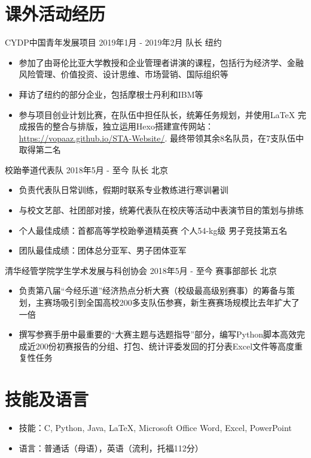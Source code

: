 \documentclass{resumeZH}
\begin{document}
    \section{课外活动经历}
    \Experience
    {CYDP中国青年发展项目}
    {2019年1月 - 2019年2月}
    {队长}
    {纽约}
    \begin{itemize}
        \item 参加了由哥伦比亚大学教授和企业管理者讲演的课程，包括行为经济学、金融风险管理、价值投资、设计思维、市场营销、国际组织等
        \item 拜访了纽约的部分企业，包括摩根士丹利和IBM等
        \item 参与项目创业计划比赛，在队伍中担任队长，统筹任务规划，并使用{\LaTeX} 完成报告的整合与排版，独立运用Hexo搭建宣传网站：\href{https://vopaaz.github.io/STA-Website/}{https://vopaaz.github.io/STA-Website/}. 最终带领其余8名队员，在7支队伍中取得第二名
    \end{itemize}

    \Experience
    {校跆拳道代表队}
    {2018年5月 - 至今}
    {队长}
    {北京}

    \begin{itemize}
        \item 负责代表队日常训练，假期时联系专业教练进行寒训暑训
        \item 与校文艺部、社团部对接，统筹代表队在校庆等活动中表演节目的策划与排练
        \item 个人最佳成绩：首都高等学校跆拳道精英赛 个人54-kg级 男子竞技第五名
        \item 团队最佳成绩：团体总分亚军、男子团体亚军
    \end{itemize}

    \Experience
    {清华经管学院学生学术发展与科创协会}
    {2018年5月 - 至今}
    {赛事部部长}
    {北京}

    \begin{itemize}
        \item 负责第八届“今经乐道”经济热点分析大赛（校级最高级别赛事）的筹备与策划，主赛场吸引到全国高校200多支队伍参赛，新生赛赛场规模比去年扩大了一倍
        \item 撰写参赛手册中最重要的“大赛主题与选题指导”部分，编写Python脚本高效完成近200份初赛报告的分组、打包、统计评委发回的打分表Excel文件等高度重复性任务
    \end{itemize}

    \section{技能及语言}
    \vspace{0.618ex}
    \begin{itemize}
        \item 技能：C, Python, Java, {\LaTeX}, Microsoft Office Word, Excel, PowerPoint
        \item 语言：普通话（母语），英语（流利，托福112分）
    \end{itemize}
\end{document}
